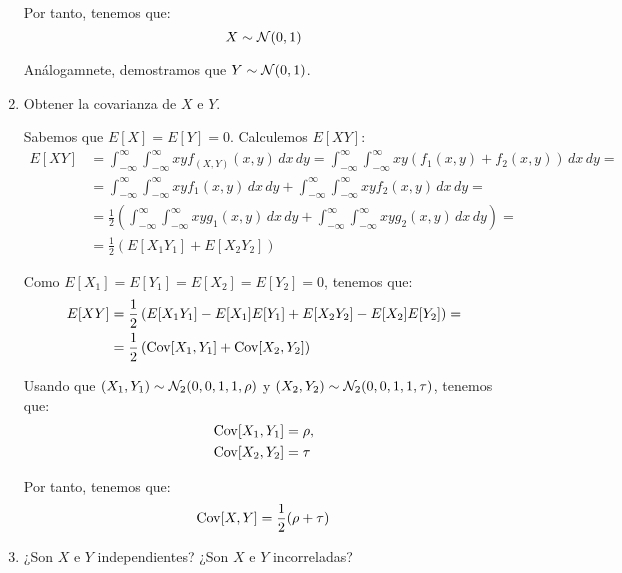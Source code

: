 \begin{ejercicio}
\begin{enumerate}
        Por tanto, tenemos que:
        \begin{equation*}
            X\sim \mathcal{N}(0,1)
        \end{equation*}

        Análogamnete, demostramos que $Y\sim \mathcal{N}(0,1)$.

        \item Obtener la covarianza de $X$ e $Y$.
        
        Sabemos que $E[X]=E[Y]=0$. Calculemos $E[XY]$:
        \begin{align*}
            E[XY] &= \int_{-\infty}^\infty\int_{-\infty}^\infty xyf_{(X,Y)}(x,y)\,dx\,dy = \int_{-\infty}^\infty\int_{-\infty}^\infty xy(f_1(x,y)+f_2(x,y))\,dx\,dy =\\
            &= \int_{-\infty}^\infty\int_{-\infty}^\infty xyf_1(x,y)\,dx\,dy + \int_{-\infty}^\infty\int_{-\infty}^\infty xyf_2(x,y)\,dx\,dy
            =\\&= \frac{1}{2}\left(\int_{-\infty}^\infty\int_{-\infty}^\infty xyg_1(x,y)\,dx\,dy + \int_{-\infty}^\infty\int_{-\infty}^\infty xyg_2(x,y)\,dx\,dy\right)
            =\\&= \frac{1}{2}\left(E[X_1Y_1] + E[X_2Y_2]\right)
        \end{align*}

        Como $E[X_1]=E[Y_1]=E[X_2]=E[Y_2]=0$, tenemos que:
        \begin{align*}
            E[XY]
            &= \frac{1}{2}\left(E[X_1Y_1] - E[X_1]E[Y_1] + E[X_2Y_2] - E[X_2]E[Y_2]\right)
            =\\&= \frac{1}{2}\left(\operatorname{Cov}[X_1,Y_1] + \operatorname{Cov}[X_2,Y_2]\right)
        \end{align*}

        Usando que $(X_1,Y_1)\sim \mathcal{N}_2(0,0,1,1,\rho)$ y $(X_2,Y_2)\sim \mathcal{N}_2(0,0,1,1,\tau)$, tenemos que:
        \begin{align*}
            \operatorname{Cov}[X_1,Y_1] &= \rho,\\
            \operatorname{Cov}[X_2,Y_2] &= \tau
        \end{align*}

        Por tanto, tenemos que:
        \begin{equation*}
            \operatorname{Cov}[X,Y] = \frac{1}{2}(\rho + \tau)
        \end{equation*}
        \item ¿Son $X$ e $Y$ independientes? ¿Son $X$ e $Y$ incorreladas?
        

\end{enumerate}
\end{ejercicio}
